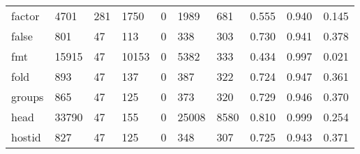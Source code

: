 \begin{longtable}{lp{2.0cm}p{2.0cm}p{2.0cm}p{2.0cm}p{2.0cm}p{2.0cm}p{2.0cm}p{2.0cm}p{2.0cm}}
factor    &                   4701 &                                281 &                              1750 &                                0 &                              1989 &                             681 &                                   0.555 &                                  0.940 &                                0.145 \\
false     &                    801 &                                 47 &                               113 &                                0 &                               338 &                             303 &                                   0.730 &                                  0.941 &                                0.378 \\
fmt       &                  15915 &                                 47 &                             10153 &                                0 &                              5382 &                             333 &                                   0.434 &                                  0.997 &                                0.021 \\
fold      &                    893 &                                 47 &                               137 &                                0 &                               387 &                             322 &                                   0.724 &                                  0.947 &                                0.361 \\
groups    &                    865 &                                 47 &                               125 &                                0 &                               373 &                             320 &                                   0.729 &                                  0.946 &                                0.370 \\
head      &                  33790 &                                 47 &                               155 &                                0 &                             25008 &                            8580 &                                   0.810 &                                  0.999 &                                0.254 \\
hostid    &                    827 &                                 47 &                               125 &                                0 &                               348 &                             307 &                                   0.725 &                                  0.943 &                                0.371 \\

\end{longtable}
